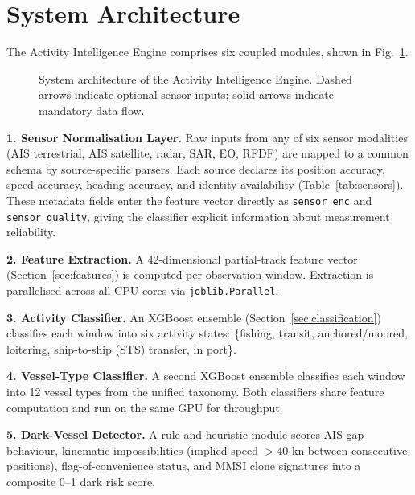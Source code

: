 \documentclass[journal]{IEEEtran}
\begin{document}
\section{System Architecture}
\label{sec:architecture}

The Activity Intelligence Engine comprises six coupled modules, shown in
Fig.~\ref{fig:architecture}.

\begin{figure}[!t]
  \centering
  \caption{System architecture of the Activity Intelligence Engine.
           Dashed arrows indicate optional sensor inputs; solid arrows
           indicate mandatory data flow.}
  \label{fig:architecture}
\end{figure}

\textbf{1. Sensor Normalisation Layer.}
Raw inputs from any of six sensor modalities (AIS terrestrial, AIS
satellite, radar, SAR, EO, RFDF) are mapped to a common schema by
source-specific parsers. Each source declares its position accuracy,
speed accuracy, heading accuracy, and identity availability
(Table~\ref{tab:sensors}). These metadata fields enter the feature
vector directly as \texttt{sensor\_enc} and \texttt{sensor\_quality},
giving the classifier explicit information about measurement reliability.

\textbf{2. Feature Extraction.}
A 42-dimensional partial-track feature vector (Section~\ref{sec:features})
is computed per observation window. Extraction is parallelised across all
CPU cores via \texttt{joblib.Parallel}.

\textbf{3. Activity Classifier.}
An XGBoost ensemble (Section~\ref{sec:classification}) classifies each
window into six activity states: \{fishing, transit, anchored/moored,
loitering, ship-to-ship (STS) transfer, in port\}.

\textbf{4. Vessel-Type Classifier.}
A second XGBoost ensemble classifies each window into 12 vessel types
from the unified taxonomy. Both classifiers share feature computation
and run on the same GPU for throughput.

\textbf{5. Dark-Vessel Detector.}
A rule-and-heuristic module scores AIS gap behaviour, kinematic
impossibilities (implied speed $>40$ kn between consecutive positions),
flag-of-convenience status, and MMSI clone signatures into a composite
0--1 dark risk score.
\end{document}
